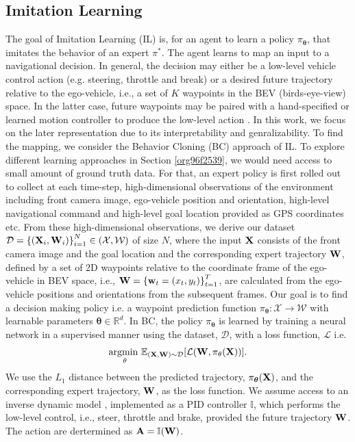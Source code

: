 \documentclass[letterpaper, 12pt]{book}
\theoremstyle{definition}
\theoremstyle{definition}
\theoremstyle{definition}
\theoremstyle{definition}
\theoremstyle{definition}
\begin{document}
\subsection{Imitation Learning \label{orgb2e7131}}
\label{sec:org24ff038}
The goal of Imitation Learning (IL) is, for an agent to learn a policy
\(\pi_{\boldsymbol{\theta}}\), that imitates the behavior of an expert \(\pi^{*}\). The
agent learns to map an input to a navigational decision. In general, the
decision may either be a low-level vehicle control action
\cite{Codevilla2019} (e.g. steering, throttle and break) or a desired future
trajectory relative to the ego-vehicle, i.e., a set of \(K\) waypoints
\cite{Chen2019,Mueller2018} in the BEV (birds-eye-view) space. In the latter
case, future waypoints may be paired with a hand-specified or learned motion
controller to produce the low-level action \cite{Chen2019,Mueller2018}. In
this work, we focus on the later representation due to its interpretability
and genralizability. To find the mapping, we consider the Behavior Cloning
(BC) approach of IL. To explore different learning approaches in Section
\ref{org96f2539}, we would need access to small amount of ground truth
data. For that, an expert policy is first rolled out to collect at each
time-step, high-dimensional observations of the environment including front
camera image, ego-vehicle position and orientation, high-level navigational
command and high-level goal location provided as GPS coordinates etc. From
these high-dimensional observations, we derive our dataset \(\mathcal{D} = \left\lbrace (\textbf
   X_{i}, \textbf W_{i}) \right\rbrace_{i=1}^{N}\in(\mathcal{X},\mathcal{W})\) of size \(N\), where the input
\(\textbf X\) consists of the front camera image and the goal location and the
corresponding expert trajectory \(\textbf W\), defined by a set of 2D waypoints
relative to the coordinate frame of the ego-vehicle in BEV space, i.e., \(\textbf
   W=\left\lbrace \textbf w_{t}=(x_{t},y_{t}) \right\rbrace_{t=1}^{T}\), are calculated from the
ego-vehicle positions and orientations from the subsequent frames. Our goal
is to find a decision making policy i.e. a waypoint prediction function
\(\pi_{\boldsymbol{\theta}}:\mathcal{X}\to\mathcal{W}\) with learnable parameters
\(\boldsymbol{\theta}\in\mathbb{R}^{d}\). In BC, the policy \(\pi_{\boldsymbol{\theta}}\) is learned by
training a neural network in a supervised manner using the dataset, \(\mathcal{D}\),
with a loss function, \(\mathcal{L}\) i.e.  \[\underset{{\theta}}{\text{argmin }} \mathbb{E}_{(\textbf
   X,\textbf W)\sim \mathcal{D}} [\mathcal{L}(\textbf W,\pi_{\theta}(\textbf X))].\] We use the \(L_{1}\)
distance between the predicted trajectory, \(\pi_{\boldsymbol{\theta}}(\textbf X)\), and the
corresponding expert trajectory, \(\textbf W\), as the loss function. We assume
access to an inverse dynamic model \cite{10.2307/j.ctt183ph6v}, implemented
as a PID controller \(\mathbb{I}\), which performs the low-level control, i.e.,
steer, throttle and brake, provided the future trajectory \(\textbf W\). The
action are dertermined as \(\textbf A=\mathbb{I}(\textbf W)\).
\end{document}
